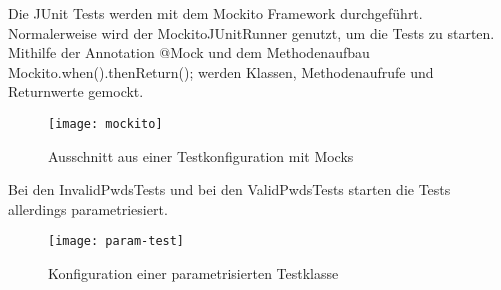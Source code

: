 Die JUnit Tests werden mit dem Mockito Framework durchgeführt.
Normalerweise wird der MockitoJUnitRunner genutzt, um die Tests zu starten.
Mithilfe der Annotation @Mock und dem Methodenaufbau Mockito.when().thenReturn(); werden
Klassen, Methodenaufrufe und Returnwerte gemockt.

\begin{figure}[H]
    \centering
    \texttt{[image: mockito]}
    \caption[]{Ausschnitt aus einer Testkonfiguration mit Mocks}
    \label{fig:mockito}
\end{figure}

Bei den InvalidPwdsTests und bei den ValidPwdsTests starten die Tests allerdings parametriesiert.

\begin{figure}[H]
    \centering
    \texttt{[image: param-test]}
    \caption[]{Konfiguration einer parametrisierten Testklasse}
    \label{fig:param}
\end{figure}